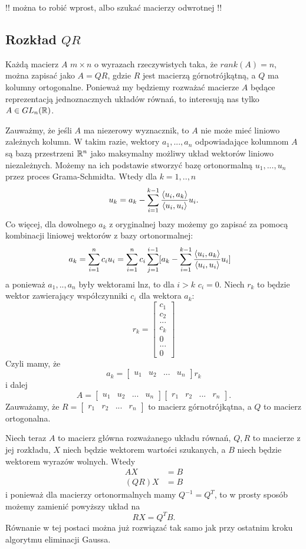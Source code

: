 !! można to robić wprost, albo szukać macierzy odwrotnej !!

\subsection{Rozkład $QR$}

Każdą macierz $A$ $m\times n$ o wyrazach rzeczywistych taka, że $rank(A)=n$, można zapisać jako $A=QR$, gdzie $R$ jest macierzą górnotrójkątną, a $Q$ ma kolumny ortogonalne. Ponieważ my będziemy rozważać macierze $A$ będące reprezentacją jednoznacznych układów równań, to interesują nas tylko $A\in GL_n(\mathbb{R})$.

Zauważmy, że jeśli $A$ ma niezerowy wyznacznik, to $A$ nie może mieć liniowo zależnych kolumn. W takim razie, wektory $a_1,...,a_n$ odpowiadające kolumnom $A$ są bazą przestrzeni $\mathbb{R}^n$ jako maksymalny możliwy układ wektorów liniowo niezależnych. Możemy na ich podstawie stworzyć bazę ortonormalną $u_1,...,u_n$ przez proces Grama-Schmidta. Wtedy dla $k=1,..,n$
$$u_k=a_k-\sum\limits_{i=1}^{k-1}{\langle u_i,a_k\rangle\over \langle u_i,u_i\rangle}u_i.$$
Co więcej, dla dowolnego $a_k$ z oryginalnej bazy możemy go zapisać za pomocą kombinacji liniowej wektorów z bazy ortonormalnej:
\begin{align*}
    a_k&=\sum\limits_{i=1}^n c_iu_i=\sum\limits_{i=1}^nc_i\sum\limits_{j=1}^{i-1} [a_k-\sum\limits_{i=1}^{k-1}{\langle u_i,a_k\rangle\over \langle u_i,u_i\rangle}u_i]
\end{align*}
a ponieważ $a_1,..,a_n$ były wektorami lnz, to dla $i> k$ $c_i=0$. Niech $r_k$ to będzie wektor zawierający współczynniki $c_i$ dla wektora $a_k$:
$$r_k=\begin{bmatrix}
    c_1\\
    c_2\\
    ...\\
    c_k\\
    0\\
    ...\\
    0
\end{bmatrix}$$
Czyli mamy, że
$$a_k=\begin{bmatrix}
    u_1&u_2&...&u_n
\end{bmatrix}r_k
$$
i dalej
$$
A=\begin{bmatrix}
    u_1&u_2&...&u_n
\end{bmatrix}\begin{bmatrix}
    r_1&r_2&...&r_n
\end{bmatrix}.
$$
Zauważamy, że $R=\begin{bmatrix}
    r_1&r_2&...&r_n
\end{bmatrix}$ to macierz górnotrójkątna, a $Q$ to macierz ortogonalna.

Niech teraz $A$ to macierz główna rozważanego układu równań, $Q,R$ to macierze z jej rozkładu, $X$ niech będzie wektorem wartości szukanych, a $B$ niech będzie wektorem wyrazów wolnych. Wtedy
\begin{align*}
    AX&=B\\
    (QR)X&=B
\end{align*}
i ponieważ dla macierzy ortonormalnych mamy $Q^{-1}=Q^T$, to w prosty sposób możemy zamienić powyższy układ na
$$RX=Q^TB.$$
Równanie w tej postaci można już rozwiązać tak samo jak przy ostatnim kroku algorytmu eliminacji Gaussa.
